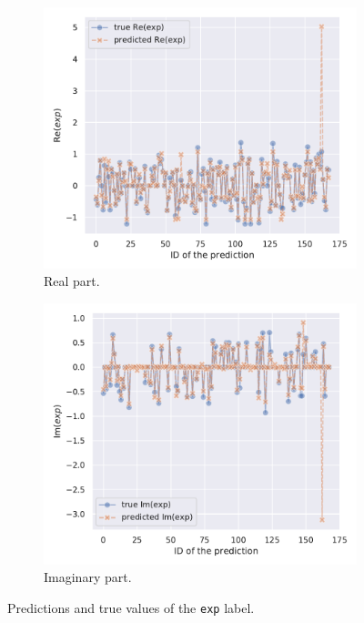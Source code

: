 \begin{figure}[htbp]
  \centering
  \begin{subfigure}{0.45\textwidth}
    \centering
    \includegraphics[width=\linewidth]{img/ann_model_test_re_lineplot}
    \caption{Real part.}
  \end{subfigure}
  \begin{subfigure}{0.45\textwidth}
    \centering
    \includegraphics[width=\linewidth]{img/ann_model_test_im_lineplot}
    \caption{Imaginary part.}
  \end{subfigure}
  \caption{Predictions and true values of the \texttt{exp} label.}
  \label{fig:wzw:preds}
\end{figure}
